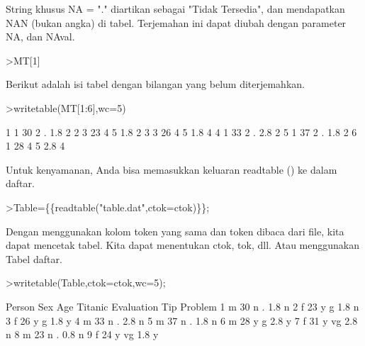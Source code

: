 \documentclass[a4paper,10pt]{article}
\begin{document}
\begin{eulernotebook}
\begin{eulercomment}
\begin{eulercomment}
\begin{eulercomment}
\begin{eulercomment}
\begin{eulercomment}
\begin{eulercomment}
\begin{eulercomment}
\begin{eulercomment}
\begin{eulercomment}
String khusus NA = "." diartikan sebagai "Tidak Tersedia", dan
mendapatkan NAN (bukan angka) di tabel. Terjemahan ini dapat diubah
dengan parameter NA, dan NAval.
\end{eulercomment}
\begin{eulerprompt}
>MT[1]
\end{eulerprompt}
\begin{euleroutput}
  [1,  1,  30,  2,  NAN,  1.8,  2]
\end{euleroutput}
\begin{eulercomment}
Berikut adalah isi tabel dengan bilangan yang belum diterjemahkan.
\end{eulercomment}
\begin{eulerprompt}
>writetable(MT[1:6],wc=5)
\end{eulerprompt}
\begin{euleroutput}
      1    1   30    2    .  1.8    2
      2    3   23    4    5  1.8    2
      3    3   26    4    5  1.8    4
      4    1   33    2    .  2.8    2
      5    1   37    2    .  1.8    2
      6    1   28    4    5  2.8    4
\end{euleroutput}
\begin{eulercomment}
Untuk kenyamanan, Anda bisa memasukkan keluaran readtable () ke dalam\\
daftar.
\end{eulercomment}
\begin{eulerprompt}
>Table=\{\{readtable("table.dat",ctok=ctok)\}\}; 
\end{eulerprompt}
\begin{eulercomment}
Dengan menggunakan kolom token yang sama dan token dibaca dari file,
kita dapat mencetak tabel. Kita dapat menentukan ctok, tok, dll. Atau
menggunakan Tabel daftar.
\end{eulercomment}
\begin{eulerprompt}
>writetable(Table,ctok=ctok,wc=5);
\end{eulerprompt}
\begin{euleroutput}
   Person  Sex  Age Titanic Evaluation  Tip Problem
        1    m   30       n          .  1.8       n
        2    f   23       y          g  1.8       n
        3    f   26       y          g  1.8       y
        4    m   33       n          .  2.8       n
        5    m   37       n          .  1.8       n
        6    m   28       y          g  2.8       y
        7    f   31       y         vg  2.8       n
        8    m   23       n          .  0.8       n
        9    f   24       y         vg  1.8       y

\end{euleroutput}
\end{eulercomment}
\end{eulercomment}
\end{eulercomment}
\end{eulercomment}
\end{eulercomment}
\end{eulercomment}
\end{eulercomment}
\end{eulercomment}
\end{eulernotebook}
\end{document}
